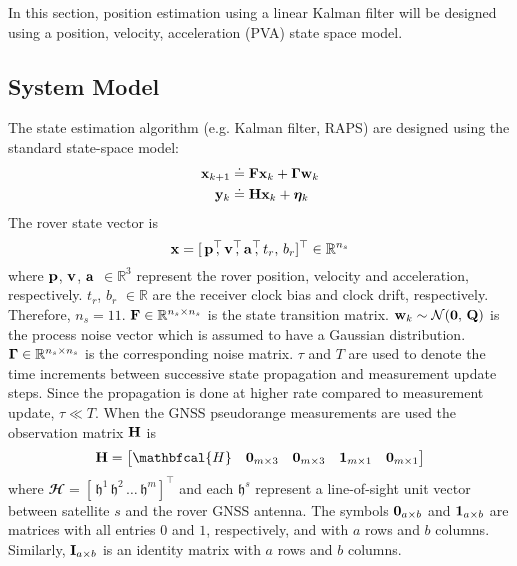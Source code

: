 In this section, position estimation using a linear Kalman filter will be designed using a position, velocity, acceleration (PVA) state space model.

\subsection{System Model}
The state estimation algorithm (e.g. Kalman filter, RAPS) are designed using the standard state-space model:
\begin{align} \label{eqn:state_prop_model}
	\mathbf{x}_{k+1} &\doteq \mathbf{F} \mathbf{x}_k + \boldsymbol{\Gamma} \mathbf{w}_k \\
	\label{eqn:msr_update_model}
	\mathbf{y}_k &\doteq \mathbf{H} \mathbf{x}_k + \boldsymbol{\eta}_k	
\end{align} 
The rover state vector is 
\begin{equation} \label{eqn:state_vector}
	\Boldx = [\,\Boldp^\top \!\!\!, \, \Boldv^\top \!\!\!, \, \Bolda^\top \!\!\!, \, t_r, \, b_r]^\top 
	\in \mathbb{R}^{n_s}
\end{equation}
where $\mathbf{p}$, $\mathbf{v}$, $\mathbf{a}$ $\in \mathbb{R}^3$ represent the rover position, velocity and acceleration, respectively. $t_r$, $b_r$ $\in \mathbb{R}$ are the receiver clock bias and clock drift, respectively. 
Therefore, $n_s = 11$. $\mathbf{F} \in \mathbb{R}^{n_s \times n_s}$ is the state transition matrix.
$\mathbf{w}_k \sim \mathcal{N}(\boldsymbol{0},\,\mathbf{Q})$ is the process noise vector which is assumed to have a Gaussian distribution. $\boldsymbol{\Gamma} \in \mathbb{R}^{n_s \times n_s}$ is the corresponding noise matrix. $\tau$ and $T$ are used to denote the time increments between successive state propagation and measurement update steps. 
Since the propagation is done at higher rate compared to measurement update, $\tau \ll T$.
When the GNSS pseudorange measurements are used the observation matrix $\mathbf{H}$ is
\begin{equation}
	\BoldH = \begin{bmatrix}		
		\mathbfcal{H} & \0_{m \times 3} & \0_{m \times 3} & \1_{m \times 1} & \0_{m \times 1} \\		
	\end{bmatrix}
\end{equation}
where $\mathbfcal{H} = [\, \mathfrak{h}^1 \, \mathfrak{h}^2 \, \dots \, \mathfrak{h}^m ]^\top$ and each $\mathfrak{h}^s$ represent a line-of-sight unit vector between satellite $s$ and the rover GNSS antenna. 
The symbols $\boldsymbol{0}_{a \times b}$ and $\boldsymbol{1}_{a \times b}$ are  matrices with all entries $0$ and $1$, respectively, and with $a$ rows and $b$ columns. 
Similarly, $\mathbf{I}_{a \times b}$ is an identity matrix with $a$ rows and $b$ columns.

